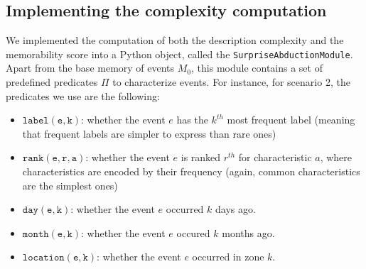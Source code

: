 \documentclass[entropy,article,submit,moreauthors,pdftex]{Definitions/mdpi}
\begin{document}
\subsection{Implementing the complexity computation}

We implemented the computation of both the description complexity and the memorability score into a Python object, called the \texttt{SurpriseAbductionModule}. Apart from the base memory of events $M_0$, this module contains a set of predefined predicates $\Pi$ to characterize events. For instance, for scenario 2, the predicates we use are the following:
\begin{itemize}
    \item $\mathtt{label(e, k)}$: whether the event $e$ has the $k^{th}$ most frequent label (meaning that frequent labels are simpler to express than rare ones)
    \item $\mathtt{rank(e, r, a)}$: whether the event $e$ is ranked $r^{th}$ for characteristic $a$, where characteristics are encoded by their frequency (again, common characteristics are the simplest ones)
    \item $\mathtt{day(e, k)}$: whether the event $e$ occurred $k$ days ago.
    \item $\mathtt{month(e, k)}$: whether the event $e$ occured $k$ months ago.
    \item $\mathtt{location(e, k)}$: whether the event $e$ occurred in zone
          $k$.
\end{itemize}


\end{document}
